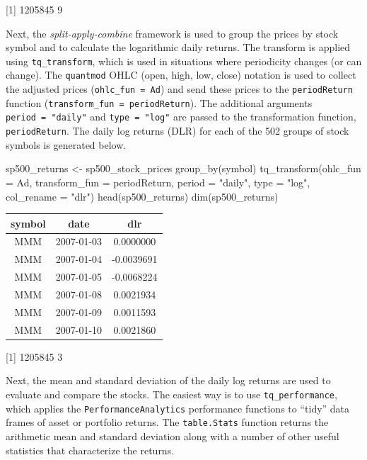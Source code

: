 {[}1{]} 1205845 9

\hspace{20 mm}

Next, the \emph{split-apply-combine} framework is used to group the
prices by stock symbol and to calculate the logarithmic daily returns.
The transform is applied using \texttt{tq\_transform}, which is used in
situations where periodicity changes (or can change). The
\texttt{quantmod} OHLC (open, high, low, close) notation is used to
collect the adjusted prices (\texttt{ohlc\_fun\ =\ Ad}) and send these
prices to the \texttt{periodReturn} function
(\texttt{transform\_fun\ =\ periodReturn}). The additional arguments
\texttt{period\ =\ "daily"} and \texttt{type\ =\ "log"} are passed to
the transformation function, \texttt{periodReturn}. The daily log
returns (DLR) for each of the 502 groups of stock symbols is generated
below.

\begin{Schunk}
\begin{Sinput}
sp500_returns <- sp500_stock_prices %
    group_by(symbol) %
    tq_transform(ohlc_fun = Ad, transform_fun = periodReturn, 
                 period = "daily", type = "log", col_rename = "dlr")
head(sp500_returns)
dim(sp500_returns)
\end{Sinput}
\end{Schunk}

\begin{tabular}{ccc}
\toprule
symbol & date & dlr\\
\midrule
MMM & 2007-01-03 & 0.0000000\\
MMM & 2007-01-04 & -0.0039691\\
MMM & 2007-01-05 & -0.0068224\\
MMM & 2007-01-08 & 0.0021934\\
MMM & 2007-01-09 & 0.0011593\\
MMM & 2007-01-10 & 0.0021860\\
\bottomrule
\end{tabular}

{[}1{]} 1205845 3

\hspace{20 mm}

Next, the mean and standard deviation of the daily log returns are used
to evaluate and compare the stocks. The easiest way is to use
\texttt{tq\_performance}, which applies the
\texttt{PerformanceAnalytics} performance functions to ``tidy'' data
frames of asset or portfolio returns. The \texttt{table.Stats} function
returns the arithmetic mean and standard deviation along with a number
of other useful statistics that characterize the returns.

